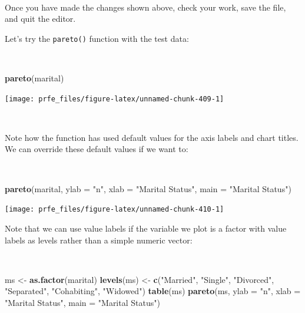 \documentclass[12pt,a4paper]{book}
\newenvironment{Shaded}{\begin{snugshade}}{\end{snugshade}}
\newcommand{\DataTypeTok}[1]{\textcolor[rgb]{0.13,0.29,0.53}{#1}}
\newcommand{\KeywordTok}[1]{\textcolor[rgb]{0.13,0.29,0.53}{\textbf{#1}}}
\newcommand{\NormalTok}[1]{#1}
\newcommand{\StringTok}[1]{\textcolor[rgb]{0.31,0.60,0.02}{#1}}
\theoremstyle{definition}
\theoremstyle{definition}
\theoremstyle{definition}
\theoremstyle{remark}
\begin{document}
~

Once you have made the changes shown above, check your work, save the
file, and quit the editor.

\newpage

Let's try the \texttt{pareto()} function with the test data:

~

\begin{Shaded}
\begin{Highlighting}[]
\KeywordTok{pareto}\NormalTok{(marital)}
\end{Highlighting}
\end{Shaded}

\begin{center}\texttt{[image: prfe\_files/figure-latex/unnamed-chunk-409-1]} \end{center}

~

Note how the function has used default values for the axis labels and
chart titles. We can override these default values if we want to:

~

\begin{Shaded}
\begin{Highlighting}[]
\KeywordTok{pareto}\NormalTok{(marital, }\DataTypeTok{ylab =} \StringTok{"n"}\NormalTok{, }\DataTypeTok{xlab =} \StringTok{"Marital Status"}\NormalTok{,}
       \DataTypeTok{main =} \StringTok{"Marital Status"}\NormalTok{)}
\end{Highlighting}
\end{Shaded}

\begin{center}\texttt{[image: prfe\_files/figure-latex/unnamed-chunk-410-1]} \end{center}

\newpage

Note that we can use value labels if the variable we plot is a factor
with value labels as levels rather than a simple numeric vector:

~

\begin{Shaded}
\begin{Highlighting}[]
\NormalTok{ms <-}\StringTok{ }\KeywordTok{as.factor}\NormalTok{(marital)}
\KeywordTok{levels}\NormalTok{(ms) <-}\StringTok{ }\KeywordTok{c}\NormalTok{(}\StringTok{"Married"}\NormalTok{, }\StringTok{"Single"}\NormalTok{, }\StringTok{"Divorced"}\NormalTok{, }\StringTok{"Separated"}\NormalTok{,}
                \StringTok{"Cohabiting"}\NormalTok{, }\StringTok{"Widowed"}\NormalTok{)}
\KeywordTok{table}\NormalTok{(ms)}
\KeywordTok{pareto}\NormalTok{(ms, }\DataTypeTok{ylab =} \StringTok{"n"}\NormalTok{, }\DataTypeTok{xlab =} \StringTok{"Marital Status"}\NormalTok{,}
       \DataTypeTok{main =} \StringTok{"Marital Status"}\NormalTok{)}
\end{Highlighting}
\end{Shaded}
\end{document}
